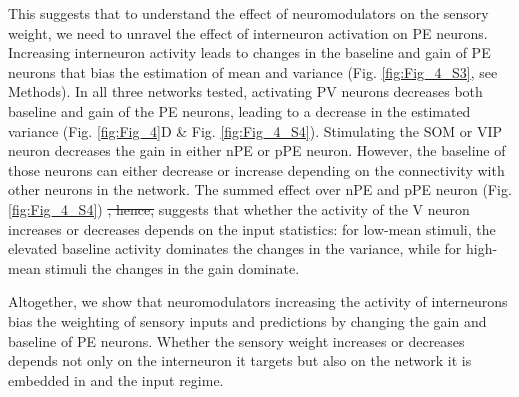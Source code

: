 \documentclass[10pt,a4paper]{article}
\providecommand{\DIFdeltex}[1]{{\protect\color{red}\sout{#1}}}                      %
\providecommand{\DIFdelbegin}{} %
\providecommand{\DIFdelend}{} %
\providecommand{\DIFdel}[1]{\texorpdfstring{\DIFdeltex{#1}}{}} %
\newcommand{\DIFscaledelfig}{0.5}
\newlength{\DIFdelgraphicswidth} %
\newlength{\DIFdelgraphicsheight} %
\newcommand{\DIFdelincludegraphics}[2][]{%
\sbox{\DIFdelgraphicsbox}{\DIFOincludegraphics[#1]{#2}}%
\settoboxwidth{\DIFdelgraphicswidth}{\DIFdelgraphicsbox} %
\settoboxtotalheight{\DIFdelgraphicsheight}{\DIFdelgraphicsbox} %
\scalebox{\DIFscaledelfig}{%
\parbox[b]{\DIFdelgraphicswidth}{\usebox{\DIFdelgraphicsbox}\\[-\baselineskip] \rule{\DIFdelgraphicswidth}{0em}}\llap{\resizebox{\DIFdelgraphicswidth}{\DIFdelgraphicsheight}{%
\setlength{\unitlength}{\DIFdelgraphicswidth}%
\begin{picture}(1,1)%
\thicklines\linethickness{2pt} %
{\color[rgb]{1,0,0}\put(0,0){\framebox(1,1){}}}%
{\color[rgb]{1,0,0}\put(0,0){\line( 1,1){1}}}%
{\color[rgb]{1,0,0}\put(0,1){\line(1,-1){1}}}%
\end{picture}%
}\hspace*{3pt}}} %
} %
\DeclareRobustCommand{\DIFdelbegin}{\DIFOdelbegin \let\includegraphics\DIFdelincludegraphics} %
\DeclareRobustCommand{\DIFdelend}{\DIFOaddend \let\includegraphics\DIFOincludegraphics} %
\begin{document}
This suggests that to understand the effect of neuromodulators on the sensory weight, we need to unravel the effect of interneuron activation on PE neurons. Increasing interneuron activity leads to changes in the baseline and gain of PE neurons that bias the estimation of mean and variance (Fig. \ref{fig:Fig_4_S3}, see Methods). In all three networks tested, activating PV neurons decreases both baseline and gain of the PE neurons, leading to a decrease in the estimated variance (Fig. \ref{fig:Fig_4}D \& Fig. \ref{fig:Fig_4_S4}). Stimulating the SOM or VIP neuron decreases the gain in either nPE or pPE neuron. However, the baseline of those neurons can either decrease or increase depending on the connectivity with other neurons in the network. The summed effect over nPE and pPE neuron (Fig. \ref{fig:Fig_4_S4}) \DIFdelbegin \DIFdel{, hence, }\DIFdelend suggests that whether the activity of the V neuron increases or decreases depends on the input statistics: for low-mean stimuli, the elevated baseline activity dominates the changes in the variance, while for high-mean stimuli the changes in the gain dominate.

Altogether, we show that neuromodulators increasing the activity of interneurons bias the weighting of sensory inputs and predictions by changing the gain and baseline of PE neurons. Whether the sensory weight increases or decreases depends not only on the interneuron it targets but also on the network it is embedded in and the input regime.
\end{document}
